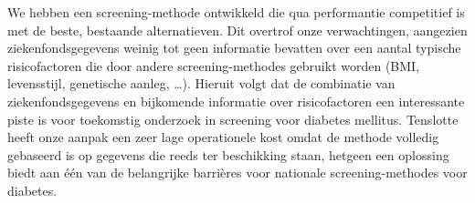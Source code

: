 We hebben een screening-methode ontwikkeld die qua performantie competitief is met de beste, bestaande alternatieven. Dit overtrof onze verwachtingen, aangezien ziekenfondsgegevens weinig tot geen informatie bevatten over een aantal typische risicofactoren die door andere screening-methodes gebruikt worden (BMI, levensstijl, genetische aanleg, \ldots). Hieruit volgt dat de combinatie van ziekenfondsgegevens en bijkomende informatie over risicofactoren een interessante piste is voor toekomstig onderzoek in screening voor diabetes mellitus. Tenslotte heeft onze aanpak een zeer lage operationele kost omdat de methode volledig gebaseerd is op gegevens die reeds ter beschikking staan, hetgeen een oplossing biedt aan \'e\'en van de belangrijke barri\`eres voor nationale screening-methodes voor diabetes.



\cleardoublepage

